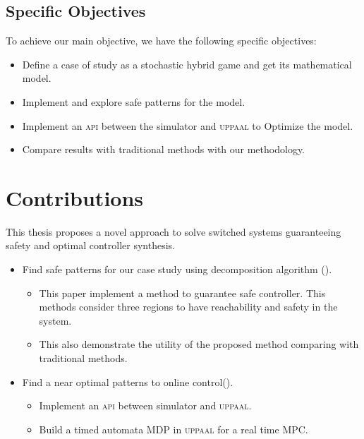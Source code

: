         \subsection*{Specific Objectives}
        To achieve our main objective, we have the following specific objectives:
        \begin{itemize}
            \item Define a case of study as a stochastic hybrid game and get its mathematical model.
            \item Implement and explore safe patterns for the model.
            \item Implement an \textsc{api} between the simulator and \textsc{uppaal} to Optimize the model.
            \item Compare results with traditional methods with our methodology.
        \end{itemize}


    \section{Contributions}
    \label{sec:contributions}
        This thesis proposes a novel approach to solve 
        switched systems guaranteeing safety and optimal
        controller synthesis. 
        \begin{itemize}
            \item Find safe patterns for our case study using
            decomposition algorithm (\cite{le2017improved}).
                \begin{itemize}
                    \item This paper implement a method to guarantee safe controller. This methods consider three regions to have reachability and safety in the system.
                    \item This also demonstrate the utility of the proposed method comparing with traditional methods.
                \end{itemize}
            \item Find a near optimal patterns to online control(\cite{larsen2016online}).
            \begin{itemize}
                \item Implement an \textsc{api} between simulator and \textsc{uppaal}.
                \item Build a timed automata \ac{MDP} in \textsc{uppaal} for a real time \ac{MPC}.
            \end{itemize}
        \end{itemize}

